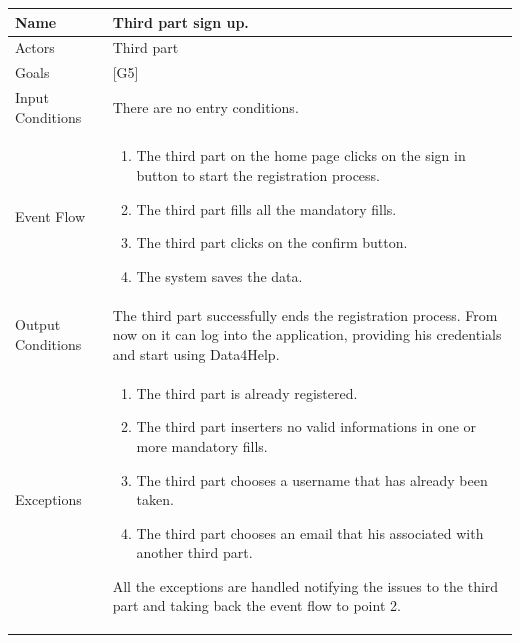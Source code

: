 \documentclass{article}
\begin{document}
\begin{center}
    \begin{tabular}{ | l | p{10cm} |}
    \hline
    Name & Third part sign up.\\ \hline
    Actors & Third part\\ \hline
   	Goals & {[G5]}\\ \hline
    Input Conditions & There are no entry conditions.\\ \hline
    Event Flow & \begin{enumerate}
    	\item The third part on the home page clicks on the sign in button to start the registration process.
		\item The third part fills all the mandatory fills.
		\item The third part clicks on the confirm button.
		\item The system saves the data.
    \end{enumerate} \\ \hline
    Output Conditions & The third part successfully ends the registration process. From now on it can log into the application, providing his credentials and start using Data4Help.  \\ \hline
    Exceptions & \begin{enumerate}
    \item The third part is already registered.
	\item The third part inserters no valid informations in one or more mandatory fills.
	\item The third part chooses a username that has already been taken. 
	\item The third part chooses an email that his associated with another third part.
\end{enumerate} All the exceptions are handled notifying the issues to the third part and taking back the event flow to point 2.  \\ \hline
    \end{tabular}
\end{center}
\end{document}
